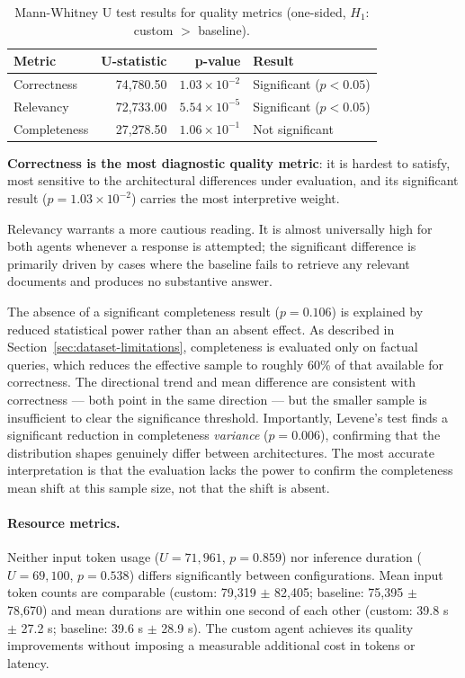 \begin{table}[H]
\centering
\caption{Mann-Whitney U test results for quality metrics (one-sided, $H_1$: custom $>$ baseline).}
\label{tab:mann-whitney}
\begin{tabular}{lrrl}
\hline
\textbf{Metric} & \textbf{U-statistic} & \textbf{p-value} & \textbf{Result} \\
\hline
Correctness  & 74{,}780.50 & $1.03 \times 10^{-2}$ & Significant ($p < 0.05$) \\
Relevancy    & 72{,}733.00 & $5.54 \times 10^{-5}$ & Significant ($p < 0.05$) \\
Completeness & 27{,}278.50 & $1.06 \times 10^{-1}$ & Not significant \\
\hline
\end{tabular}
\end{table}

\textbf{Correctness is the most diagnostic quality metric}: it is hardest to satisfy,
most sensitive to the architectural differences under evaluation, and its significant
result ($p = 1.03 \times 10^{-2}$) carries the most interpretive weight.

Relevancy warrants a more cautious reading. It is almost universally high for both
agents whenever a response is attempted; the significant difference is primarily driven
by cases where the baseline fails to retrieve any relevant documents and produces no
substantive answer.

The absence of a significant completeness result ($p = 0.106$) is explained by reduced
statistical power rather than an absent effect. As described in
Section~\ref{sec:dataset-limitations}, completeness is evaluated only on factual
queries, which reduces the effective sample to roughly 60\% of that available for
correctness. The directional trend and mean difference are consistent with correctness
--- both point in the same direction --- but the smaller sample is insufficient to clear
the significance threshold. Importantly, Levene's test finds a significant reduction in
completeness \emph{variance} ($p = 0.006$), confirming that the distribution shapes
genuinely differ between architectures. The most accurate interpretation is that the
evaluation lacks the power to confirm the completeness mean shift at this sample size,
not that the shift is absent.

\paragraph{Resource metrics.}
Neither input token usage ($U = 71{,}961$, $p = 0.859$) nor inference duration
($U = 69{,}100$, $p = 0.538$) differs significantly between configurations. Mean input
token counts are comparable (custom: 79{,}319 $\pm$ 82{,}405; baseline:
75{,}395 $\pm$ 78{,}670) and mean durations are within one second of each other
(custom: 39.8 s $\pm$ 27.2 s; baseline: 39.6 s $\pm$ 28.9 s). The custom agent achieves
its quality improvements without imposing a measurable additional cost in tokens or latency.

